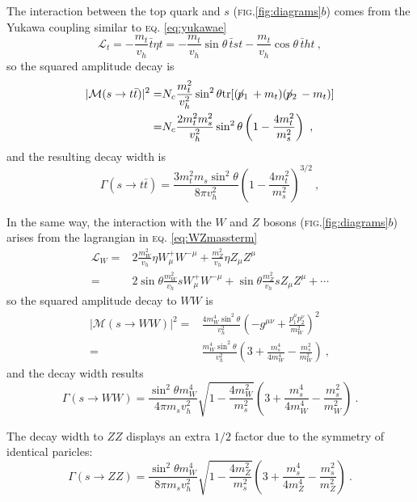 \documentclass[aps,prd,preprintnumbers,nofootinbibn,twocolumn]{revtex4}
\newcommand{\tr}{\mathrm{tr}}
\newcommand{\sla}[1]{\!\not\!#1\,}
\begin{document}
The interaction between the top quark and $s$ (\textsc{fig.}\ref{fig:diagrams}$b$) comes from the Yukawa coupling similar to \textsc{eq.} \eqref{eq:yukawae}
\begin{equation}
\mathcal{L}_t = -\frac{m_t}{v_h}\bar{t}\eta t=  -\frac{m_t}{v_h}\sin\theta\, \bar{t} s t-\frac{m_t}{v_h}\cos\theta\, \bar{t} h t\ ,
\end{equation}
so the squared amplitude decay is
\begin{align}
|\mathcal{M}(s\to t\bar{t})|^2 =& N_c \frac{m_t^2}{v_h^2}\sin^2\theta \tr[(\sla{p_1} + m_t)(\sla{p_2}-m_t)]\nonumber\\
=& N_c \frac{2 m_t^2 m_s^2 }{v_h^2} \sin^2 \theta \left(1-\frac{4 m_t^2}{m_s^2}\right)\ ,
\end{align}
and the resulting decay width is
\begin{equation}
\Gamma(s \to t \bar{t})= \frac{3 m_t^2 m_s \sin^2\theta}{8\pi  v_h^2} \left(1-\frac{4 m_t^2}{m_s^2}\right)^{3/2} \ ,
\end{equation}

In the same way, the interaction with the $W$ and $Z$ bosons (\textsc{fig.}\ref{fig:diagrams}$b$) arises from the lagrangian in \textsc{eq.} \eqref{eq:WZmassterm}
\begin{align}
\mathcal{L}_W =& 2 \frac{m_W^2}{v_h}\eta W^+_\mu W^{-\mu} + \frac{m_Z^2}{v_h} \eta Z_\mu Z^\mu\nonumber\\
=& 2 \sin \theta \frac{m_W^2}{v_h}s W^+_\mu W^{-\mu} + \sin\theta \frac{m_Z^2}{v_h} s Z_\mu Z^\mu + \cdots
\end{align}
so the squared amplitude decay to $WW$ is
\begin{align}
|\mathcal{M}(s\to WW)|^2 =& \frac{4 m_W^4 \sin^2\theta}{v_h^2} \left(-g^{\mu\nu}+\frac{p^\mu_1 p^\nu_2}{m_W^2} \right)^2\nonumber\\
=&  \frac{m_W^4 \sin^2 \theta}{v_h^2} \left(3+\frac{m_s^4}{4 m_W^4}-\frac{m_s^2}{m_W^2} \right)\ ,
\end{align}
and the decay width results
\begin{equation}
\Gamma(s \rightarrow WW)\!\!=\!\!  \frac{\sin^2\theta m_W^4}{4 \pi m_s v_h^2}  \sqrt{ 1- \frac{4 m_W^2}{m_s^2}}\!\!
\left(3\!\!+\!\!\frac{m_s^4}{4 m_W^4}\!\!-\!\!\frac{m_s^2}{m_W^2} \right)\ .
\end{equation}

The decay width to $ZZ$ displays an extra $1/2$ factor due to the symmetry of identical paricles:
\begin{equation}
\Gamma(s \rightarrow ZZ)=  \frac{\sin^2\theta m_W^4}{8 \pi m_s v_h^2} \sqrt{ 1- \frac{4 m_Z^2}{m_s^2}}
\left(3+\frac{m_s^4}{4 m_Z^4}-\frac{m_s^2}{m_Z^2} \right)\ .
\end{equation}
\end{document}
